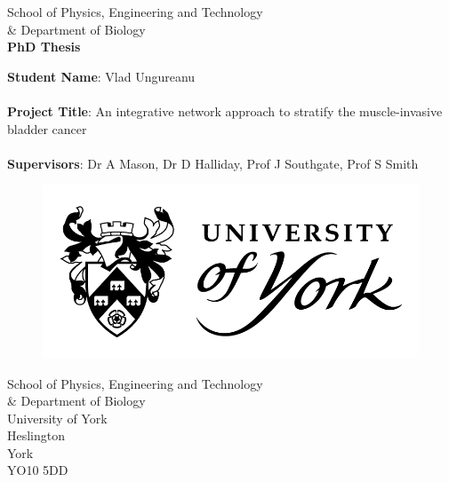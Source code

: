 \begin{titlepage} 
  \begin{center} 
    
    	\large School of Physics, Engineering and Technology \\ \& Department of Biology \\
        \vspace{1.2cm}
		\Huge \textbf{PhD Thesis} \\
        \vspace{1.2cm}
            
       \begin{flushleft}
        \large \textbf{Student Name}: Vlad Ungureanu \\~\\
        \large \textbf{Project Title}: An integrative network approach to stratify the muscle-invasive bladder cancer \\~\\
        \large \textbf{Supervisors}: Dr A Mason, Dr D Halliday, Prof J Southgate, Prof S Smith
 
       \end{flushleft} 
            
           \begin{figure}[t]
          	\includegraphics[scale=0.5]{Images/Resources/UOY_logo}
          \end{figure}
    \vspace{1.2cm}
    \small School of Physics, Engineering and Technology \\ \& Department of Biology \\
    \small University of York \\
    \small Heslington \\
    \small York \\
    \small YO10 5DD\\
                  
 \end{center} 

\end{titlepage}